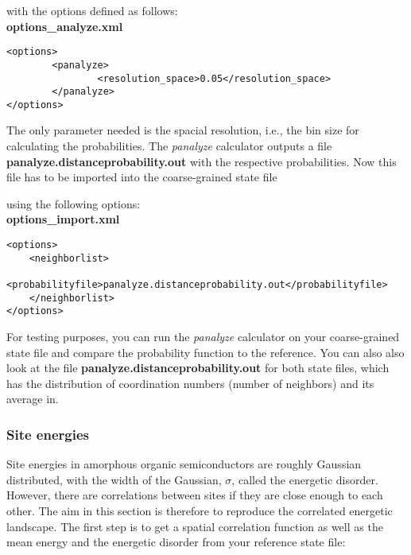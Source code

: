 
with the options defined as follows:
\\

\textbf{options\_analyze.xml}

\lstset{language=XML}
\begin{lstlisting}
<options>
        <panalyze>
                <resolution_space>0.05</resolution_space>
        </panalyze>
</options>
\end{lstlisting}

The only parameter needed is the spacial resolution, i.e., the bin size for calculating the probabilities. The \emph{panalyze} calculator outputs a file \textbf{panalyze.distanceprobability.out} with the respective probabilities.
Now this file has to be imported into the coarse-grained state file


using the following options:
\\

\textbf{options\_import.xml}

\lstset{language=XML}
\begin{lstlisting}
<options>
	<neighborlist>
                <probabilityfile>panalyze.distanceprobability.out</probabilityfile>
	</neighborlist>
</options>
\end{lstlisting}

For testing purposes, you can run the \emph{panalyze} calculator on your coarse-grained state file and compare the probability function to the reference. You can also also look at the file \textbf{panalyze.distanceprobability.out} for both state files, which has the distribution of coordination numbers (number of neighbors) and its average in.

\subsubsection{Site energies}

Site energies in amorphous organic semiconductors are roughly Gaussian distributed, with the width of the Gaussian, $\sigma$, called the energetic disorder. However, there are correlations between sites if they are close enough to each other. The aim in this section is therefore to reproduce the correlated energetic landscape.
The first step is to get a spatial correlation function as well as the mean energy and the energetic disorder from your reference state file:
\\

